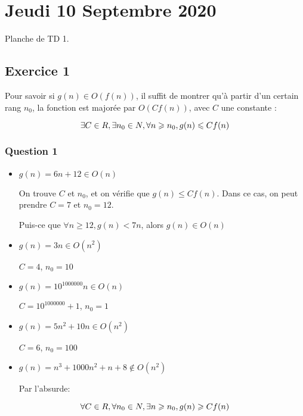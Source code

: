 \hypertarget{jeudi-10-septembre-2020}{%
\section{Jeudi 10 Septembre 2020}\label{jeudi-10-septembre-2020}}

Planche de TD 1.

\hypertarget{exercice-1}{%
\subsection{Exercice 1}\label{exercice-1}}

Pour savoir si \(g(n) \in O(f(n))\), il suffit de montrer qu'à partir
d'un certain rang \(n_0\), la fonction est majorée par \(O(Cf(n))\),
avec \(C\) une constante :

$$
\exists C \in \\R, \exists n_0 \in \\N, \forall n \geqslant n_0, g(n) \leqslant Cf(n)
$$

\hypertarget{question-1}{%
\subsubsection{Question 1}\label{question-1}}

\begin{itemize}
\item
  \(g(n) = 6n + 12 \in O(n)\)

  On trouve \(C\) et \(n_0\), et on vérifie que
  \(g(n) \leqslant Cf(n)\). Dans ce cas, on peut prendre \(C=7\) et
  \(n_0=12\).

  Puis-ce que \(\forall n \geqslant 12, g(n) < 7n\), alors
  \(g(n) \in O(n)\)
\item
  \(g(n) = 3n \in O(n^2)\)

  \(C=4\), \(n_0=10\)
\item
  \(g(n) = 10^{1000000}n \in O(n)\)

  \(C=10^{1000000}+1\), \(n_0=1\)
\item
  \(g(n) = 5n^2+10n \in O(n^2)\)

  \(C=6\), \(n_0=100\)
\item
  \(g(n) = n^3+1000n^2+n+8 \notin O(n^2)\)

  Par l'absurde:
\end{itemize}

\[
\forall C \in \\R, \forall n_0 \in \\N, \exists n \geqslant n_0, g(n) \geqslant Cf(n)
\]

